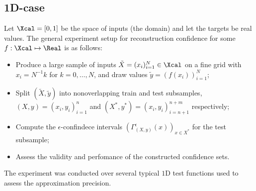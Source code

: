 \subsection{1D-case} %
\label{sub:1d_case}

Let $\Xcal =[0,1]$ be the space of inputs (the domain) and let the targets be real
values. The general experiment setup for reconstruction confidence for some
$f:\Xcal\mapsto\Real$ is as follows:
\begin{itemize}
    \item Produce a large sample of inputs $\tilde{X} = (x_i)_{i=1}^N\in \Xcal$
    on a fine grid with $x_i = N^{-1} k$ for $k=0, \ldots, N$, and draw values
    $\tilde{y}=(f(x_i))_{i=1}^N$;
    \item Split $(\tilde{X}, \tilde{y})$ into nonoverlapping train and test subsamples,
    $(X, y) = (x_i, y_i)_{i=1}^n$ and $(X^*, y^*) = (x_i, y_i)_{i=n+1}^{n+m}$ respectively;
    \item Compute the $\epsilon$-confindece intervals $(\Gamma^\epsilon_{(X, y)}(x))_{x\in X^*}$
    for the test subsample;
    \item Assess the validity and perfomance of the constructed confidence sets.
\end{itemize}

The experiment was conducted over several typical $1$D test functions used to assess the approximation precision.



